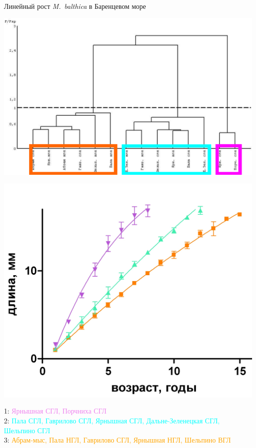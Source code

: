 \documentclass{beamer}
\begin{document}
\begin{frame}{Линейный рост {\it M.~balthica} в Баренцевом море}
	\begin{minipage}[t]{.58\linewidth}
		\begin{center}
			\includegraphics[width=\textwidth]{./dendrogramma_sravnenie_rosta_linear_all_gorizonts.pdf}
		\end{center}
	\end{minipage}
%
	\begin{minipage}[t]{.4\linewidth}
		\begin{center}
			\includegraphics[width=\textwidth]{./rost_clusters_all_crop.jpg}
		\end{center}
	\end{minipage}

1: \textcolor{violet}{Ярнышная СГЛ, Порчниха СГЛ}\\
2: \textcolor{cyan}{Пала СГЛ, Гаврилово СГЛ, Ярнышная СГЛ, Дальне-Зеленецкая СГЛ, Шельпино СГЛ}\\
3: \textcolor{orange}{Абрам-мыс, Пала НГЛ, Гаврилово СГЛ, Ярнышная НГЛ, Шельпино ВГЛ}
\end{frame}
\end{document}
